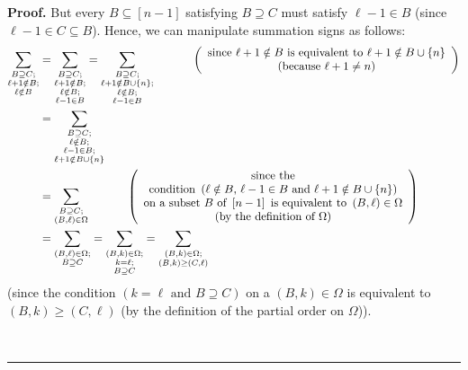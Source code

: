 \documentclass[numbers=enddot,12pt,final,onecolumn,notitlepage]{scrartcl}%
\theoremstyle{definition}
\newenvironment{proof}[1][Proof]{\noindent\textbf{#1.} }{\ \rule{0.5em}{0.5em}}
\newenvironment{verlong}{}{}
\let\sumnonlimits\sum
\renewcommand{\sum}{\sumnonlimits\limits}
\begin{document}
\begin{verlong}
\begin{proof}
But every $B\subseteq\left[  n-1\right]  $ satisfying $B\supseteq C$ must
satisfy $\ell-1\in B$ (since $\ell-1\in C\subseteq B$). Hence, we can
manipulate summation signs as follows:%
\begin{align}
\sum_{\substack{B\supseteq C;\\\ell+1\notin B;\\\ell\notin B}}  &
=\sum_{\substack{B\supseteq C;\\\ell+1\notin B;\\\ell\notin B;\\\ell-1\in
B}}=\sum_{\substack{B\supseteq C;\\\ell+1\notin B\cup\left\{  n\right\}
;\\\ell\notin B;\\\ell-1\in B}}\ \ \ \ \ \ \ \ \ \ \left(
\begin{array}
[c]{c}%
\text{since }\ell+1\notin B\text{ is equivalent to }\ell+1\notin B\cup\left\{
n\right\} \\
\text{(because }\ell+1\neq n\text{)}%
\end{array}
\right) \nonumber\\
&  =\sum_{\substack{B\supseteq C;\\\ell\notin B;\\\ell-1\in B;\\\ell+1\notin
B\cup\left\{  n\right\}  }}\nonumber\\
&  =\sum_{\substack{B\supseteq C;\\\left(  B,\ell\right)  \in\Omega
}}\ \ \ \ \ \ \ \ \ \ \left(
\begin{array}
[c]{c}%
\text{since the}\\
\text{condition }\left(  \ell\notin B\text{, }\ell-1\in B\text{ and }%
\ell+1\notin B\cup\left\{  n\right\}  \right) \\
\text{on a subset }B\text{ of }\left[  n-1\right]  \text{ is equivalent to
}\left(  B,\ell\right)  \in\Omega\\
\text{(by the definition of }\Omega\text{)}%
\end{array}
\right) \nonumber\\
&  =\sum_{\substack{\left(  B,\ell\right)  \in\Omega;\\B\supseteq C}%
}=\sum_{\substack{\left(  B,k\right)  \in\Omega;\\k=\ell;\\B\supseteq C}%
}=\sum_{\substack{\left(  B,k\right)  \in\Omega;\\\left(  B,k\right)
\geq\left(  C,\ell\right)  }} \label{pf.prop.K.Epk.M.sum-man}%
\end{align}
(since the condition $\left(  k=\ell\text{ and }B\supseteq C\right)  $ on a
$\left(  B,k\right)  \in\Omega$ is equivalent to $\left(  B,k\right)
\geq\left(  C,\ell\right)  $ (by the definition of the partial order on
$\Omega$)).


\end{proof}
\end{verlong}
\end{document}
